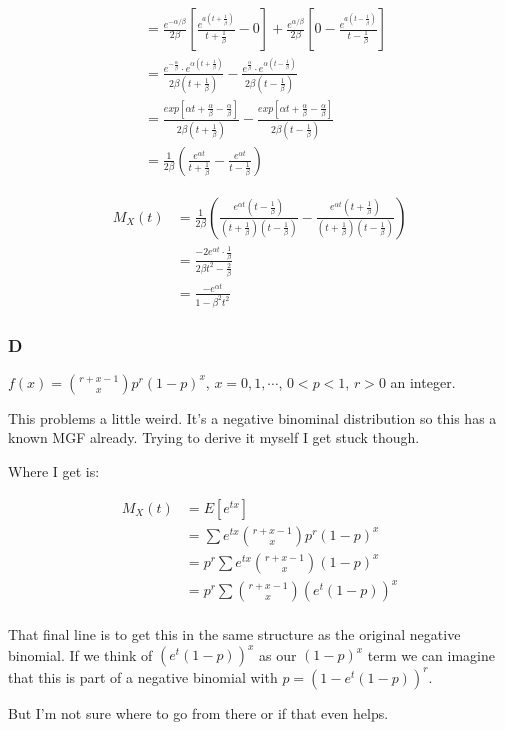 \begin{align*}
	&= \frac{e^{-\alpha/\beta}}{2\beta} \left[ \frac{e^{a(t + \frac{1}{\beta})}}{t + \frac{1}{\beta}} - 0 \right] 
	+ \frac{e^{\alpha/\beta}}{2\beta} \left[0 - \frac{e^{a(t - \frac{1}{\beta})}}{t - \frac{1}{\beta}} \right] \\
	&= \frac{e^{-\frac{\alpha}{\beta}} \cdot e^{\alpha(t + \frac{1}{\beta})}}{2\beta(t + \frac{1}{\beta})}  
	- \frac{e^{\frac{\alpha}{\beta}} \cdot e^{\alpha(t - \frac{1}{\beta})}}{2\beta(t - \frac{1}{\beta})} \\
	&= \frac{exp[\alpha t + \frac{\alpha}{\beta} - \frac{\alpha}{\beta}]}{2\beta(t + \frac{1}{\beta})} 
	- \frac{exp[\alpha t + \frac{\alpha}{\beta} - \frac{\alpha}{\beta}]}{2\beta(t - \frac{1}{\beta})} \\
	&= \frac{1}{2\beta} \left( \frac{e^{\alpha t}}{t + \frac{1}{\beta}} -   \frac{e^{\alpha t}}{t - \frac{1}{\beta}}\right)
\end{align*}

\begin{align*}
	M_X(t) &= \frac{1}{2\beta} \left( \frac{e^{\alpha t} (t - \frac{1}{\beta})}{(t + \frac{1}{\beta})(t - \frac{1}{\beta})} - \frac{e^{\alpha t} (t + \frac{1}{\beta})}{(t + \frac{1}{\beta})(t - \frac{1}{\beta})}  \right) \\
	&= \frac{-2e^{\alpha t} \cdot \frac{1}{\beta}}{2\beta t^2 - \frac{2}{\beta} } \\
	&= \frac{-e^{\alpha t}}{1 - \beta^2 t^2}
\end{align*}

\subsubsection*{D}

$f(x) = {r + x - 1 \choose x}p^r (1-p)^x$, $x=0,1,\cdots$, $0<p<1$, $r>0$ an integer. 

This problems a little weird. It's a negative binominal distribution so this has a known MGF already. Trying to derive it myself I get stuck though.

Where I get is:

\begin{align*}
	M_X(t) &= E[e^{tx}] \\
	&= \sum e^{tx} {r + x - 1 \choose x}p^r (1-p)^x \\
	&= p^r \sum e^{tx} {r + x - 1 \choose x} (1-p)^x \\
	&= p^r \sum {r + x - 1 \choose x} (e^t(1-p))^x \\
\end{align*}

That final line is to get this in the same structure as the original negative binomial. If we think of $(e^t(1-p))^x$ as our $(1-p)^x$ term we can imagine that this is part of a negative binomial with $p=(1-e^t(1-p))^r$. 

But I'm not sure where to go from there or if that even helps.
